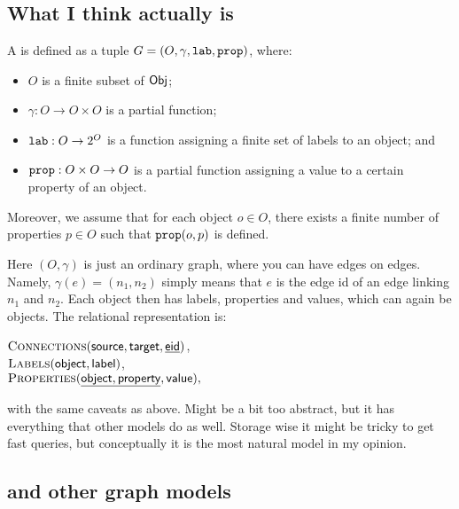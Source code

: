 \subsection{What I think \Data actually is}
\label{ssec:therealone}

\begin{definition}
 A \emph{\data} is defined as a tuple $G=(O,\gamma,\texttt{lab},\texttt{prop})$, where:
\begin{itemize}
	\item $O$ is a finite subset of $\mathsf{Obj}$;
    \item $\gamma: O \rightarrow O \times O$ is a partial function;
    \item $\texttt{lab} : O \rightarrow 2^O$ is a function
    assigning a finite set of labels to an object; and
    \item $\texttt{prop} : O \times O \rightarrow O$ is a partial function assigning a value to a certain property of an object. 
\end{itemize}
Moreover, we assume that for each object $o \in O$, there exists a finite number of properties $p \in O$ such that $\texttt{prop}(o,p)$ is defined.
\end{definition}

Here $(O,\gamma)$ is just an ordinary graph, where you can have edges on edges. Namely, $\gamma(e)=(n_1,n_2)$ simply means that $e$ is the edge id of an edge linking $n_1$ and $n_2$. Each object then has labels, properties and values, which can again be objects. The relational representation is:

\begin{center}
$\textsc{Connections}(\textsf{source},\textsf{target},\underline{\textsf{eid}})$,\\
$\textsc{Labels}(\textsf{object},\textsf{label})$,\\
$\textsc{Properties}(\underline{\textsf{object},\textsf{property}},\textsf{value}),$
\end{center}

with the same caveats as above. Might be a bit too abstract, but it has everything that other models do as well. Storage wise it might be tricky to get fast queries, but conceptually it is the most natural model in my opinion.

\subsection{\Data and other graph models}\label{ssec:whydg}

